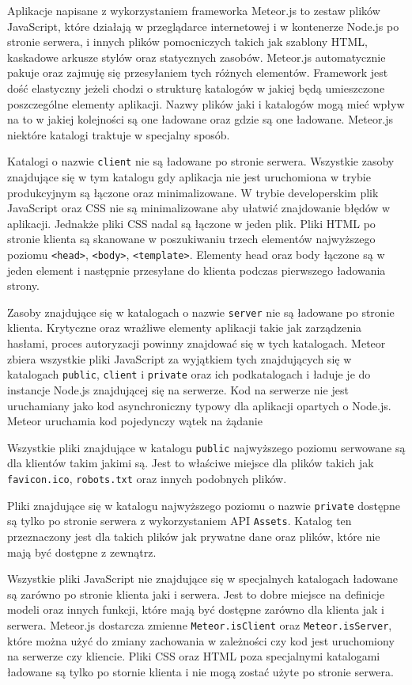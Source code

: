 Aplikacje napisane z wykorzystaniem frameworka Meteor.js to zestaw plików JavaScript, które działają w przeglądarce internetowej i w kontenerze Node.js po stronie serwera, i innych plików pomocniczych takich jak szablony HTML, kaskadowe arkusze stylów oraz statycznych zasobów. Meteor.js automatycznie pakuje oraz zajmuję się przesyłaniem tych różnych elementów. Framework jest dość elastyczny jeżeli chodzi o strukturę katalogów w jakiej będą umieszczone poszczególne elementy aplikacji. Nazwy plików jaki i katalogów mogą mieć wpływ na to w jakiej kolejności są one ładowane oraz gdzie są one ładowane. Meteor.js niektóre katalogi traktuje w specjalny sposób.

Katalogi o nazwie \verb|client| nie są ładowane po stronie serwera. Wszystkie zasoby znajdujące się w tym katalogu gdy aplikacja nie jest uruchomiona w trybie produkcyjnym są łączone oraz minimalizowane. W trybie developerskim plik JavaScript oraz CSS nie są minimalizowane aby ułatwić znajdowanie błędów w aplikacji. Jednakże pliki CSS nadal są łączone w jeden plik. Pliki HTML po stronie klienta są skanowane w poszukiwaniu trzech elementów najwyższego poziomu \verb|<head>|, \verb|<body>|, \verb|<template>|. Elementy head oraz body łączone są w jeden element i następnie przesyłane do klienta podczas pierwszego ładowania strony.

Zasoby znajdujące się w katalogach o nazwie \verb|server| nie są ładowane po stronie klienta. Krytyczne oraz wrażliwe elementy aplikacji takie jak zarządzenia hasłami, proces autoryzacji powinny znajdować się w tych katalogach. Meteor zbiera wszystkie pliki JavaScript za wyjątkiem tych znajdujących się w katalogach \verb|public|, \verb|client| i \verb|private| oraz ich podkatalogach i ładuje je do instancje Node.js znajdującej się na serwerze. Kod na serwerze nie jest uruchamiany jako kod asynchroniczny typowy dla aplikacji opartych o Node.js. Meteor uruchamia kod pojedynczy wątek na żądanie

Wszystkie pliki znajdujące w katalogu \verb|public| najwyższego poziomu serwowane są dla klientów takim jakimi są. Jest to właściwe miejsce dla plików takich jak \verb|favicon.ico|, \verb|robots.txt| oraz innych podobnych plików.

Pliki znajdujące się w katalogu najwyższego poziomu o nazwie \verb|private| dostępne są tylko po stronie serwera z wykorzystaniem API \verb|Assets|. Katalog ten przeznaczony jest dla takich plików jak prywatne dane oraz plików, które nie mają być dostępne z zewnątrz.

Wszystkie pliki JavaScript nie znajdujące się w specjalnych katalogach ładowane są zarówno po stronie klienta jaki i serwera. Jest to dobre miejsce na definicje modeli oraz innych funkcji, które mają być dostępne zarówno dla klienta jak i serwera. Meteor.js dostarcza zmienne \verb|Meteor.isClient| oraz \verb|Meteor.isServer|, które można użyć do zmiany zachowania w zależności czy kod jest uruchomiony na serwerze czy kliencie. Pliki CSS oraz HTML poza specjalnymi katalogami ładowane są tylko po stornie klienta i nie mogą zostać użyte po stronie serwera.

